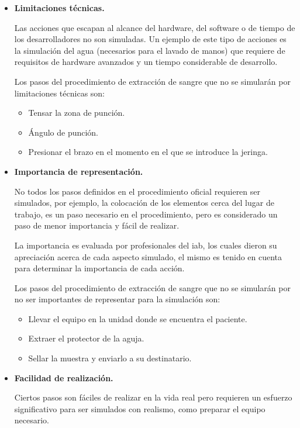 \begin{itemize}
\item  \textbf{Limitaciones técnicas.} 
    
    Las acciones que escapan al alcance del hardware, del software o de tiempo
    de los desarrolladores no son simuladas. Un ejemplo de este tipo de acciones
    es la simulación del agua (necesarios para el lavado de manos) que requiere
    de requisitos de hardware avanzados y un tiempo considerable de desarrollo.
        
    Los pasos del procedimiento de extracción de sangre que no se simularán por
    limitaciones técnicas son:
    \begin{itemize}
        \item Tensar la zona de punción.
        \item Ángulo de punción.
        \item Presionar el brazo en el momento en el que se introduce la jeringa.
    \end{itemize}
    
    
\item \textbf{Importancia de representación.}

    No todos los pasos definidos en el procedimiento oficial requieren ser
    simulados, por ejemplo, la colocación de los elementos cerca del lugar de
    trabajo, es un paso necesario en el procedimiento, pero es considerado un
    paso de menor importancia y fácil de realizar.

    La importancia es evaluada por profesionales del \Gls{iab}, los cuales
    dieron su apreciación acerca de cada aspecto simulado, el mismo es tenido en
    cuenta para determinar la importancia de cada acción.
    
    Los pasos del procedimiento de extracción de sangre que no se simularán por 
    no ser importantes de representar para la simulación son:
    \begin{itemize}
        \item Llevar el equipo en la unidad donde se encuentra el paciente.
        \item Extraer el protector de la aguja.
        \item Sellar la muestra y enviarlo a su destinatario.
    \end{itemize}
    
    
\item \textbf{Facilidad de realización.}

    Ciertos pasos son fáciles de realizar en la vida real pero requieren un
    esfuerzo significativo para ser simulados con realismo, como preparar el
    equipo necesario.


\end{itemize}
